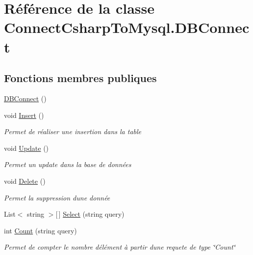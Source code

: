 \hypertarget{class_connect_csharp_to_mysql_1_1_d_b_connect}{}\section{Référence de la classe Connect\+Csharp\+To\+Mysql.\+D\+B\+Connect}
\label{class_connect_csharp_to_mysql_1_1_d_b_connect}
\subsection*{Fonctions membres publiques}
\begin{DoxyCompactItemize}
\item 
\hyperlink{class_connect_csharp_to_mysql_1_1_d_b_connect_ad807f4b8468030d8892cf55f4ab44517}{D\+B\+Connect} ()
\item 
void \hyperlink{class_connect_csharp_to_mysql_1_1_d_b_connect_a6a30b2348d7a396ae5a17d6c5b4c7c66}{Insert} ()
\begin{DoxyCompactList}\small\item\em Permet de réaliser une insertion dans la table \end{DoxyCompactList}\item 
void \hyperlink{class_connect_csharp_to_mysql_1_1_d_b_connect_acec2f0edda8c9c23e8f379fa535a05a7}{Update} ()
\begin{DoxyCompactList}\small\item\em Permet un update dans la base de données \end{DoxyCompactList}\item 
void \hyperlink{class_connect_csharp_to_mysql_1_1_d_b_connect_af451ecf5462b491981777b68d4b7414e}{Delete} ()
\begin{DoxyCompactList}\small\item\em Permet la suppression d\textquotesingle{}une donnée \end{DoxyCompactList}\item 
List$<$ string $>$\mbox{[}$\,$\mbox{]} \hyperlink{class_connect_csharp_to_mysql_1_1_d_b_connect_a1fb2c2f361c8e117087eb5da902bb4a8}{Select} (string query)
\item 
int \hyperlink{class_connect_csharp_to_mysql_1_1_d_b_connect_a93b12023ab744fe44fca28e51d5b2a06}{Count} (string query)
\begin{DoxyCompactList}\small\item\em Permet de compter le nombre d\textquotesingle{}élément à partir d\textquotesingle{}une requete de type \char`\"{}\+Count\char`\"{} \end{DoxyCompactList}\item 

\end{DoxyCompactItemize}
